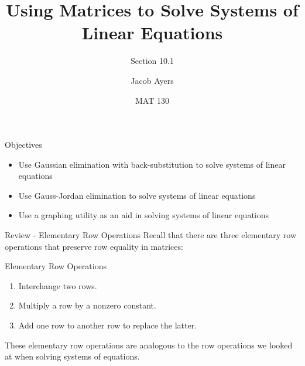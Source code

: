 \documentclass[t, aspectratio=169]{beamer}
\title[Abbr]{Using Matrices to Solve Systems of Linear Equations}
\subtitle{Section 10.1}
\author{Jacob Ayers}
\institute{Lesson \#25}
\date{MAT 130}
\begin{document}
	
	\begin{frame}
		\titlepage
	\end{frame}
	
	\begin{frame}{Objectives}
		\begin{itemize}
			\item Use Gaussian elimination with back-substitution to solve systems of linear equations
			\item Use Gauss-Jordan elimination to solve systems of linear equations
			\item Use a graphing utility as an aid in solving systems of linear equations
		\end{itemize}
	\end{frame}

	\begin{frame}{Review - Elementary Row Operations}
		Recall that there are three elementary row operations that preserve row equality in matrices:
		
		\begin{block}{Elementary Row Operations}
			\begin{enumerate}[1)]
				\item Interchange two rows.
				\item Multiply a row by a nonzero constant.
				\item Add one row to another row to replace the latter.
			\end{enumerate}
		\end{block} \pause
	
		These elementary row operations are analogous to the row operations we looked at when solving systems of equations.
	\end{frame}
\end{document}
